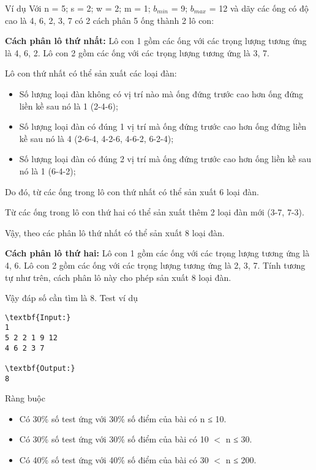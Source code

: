 Ví dụ
Với n = 5; s = 2; w = 2; m = 1; $b_{min}$ = 9; $b_{max}$ = 12 và dãy các ống có độ cao là 4, 6, 2, 3, 7 có 2 cách phân 5 ống thành 2 lô con:

\textbf{Cách phân lô thứ nhất: } Lô con 1 gồm các ống với các trọng lượng tương ứng là 4, 6, 2. Lô con 2 gồm các ống với các trọng lượng tương ứng là 3, 7.

Lô con thứ nhất có thể sản xuất các loại đàn:
\begin{itemize}
	\item Số lượng loại đàn không có vị trí nào mà ống đứng trước cao hơn ống đứng liền kề sau nó là 1 (2-4-6);
	\item Số lượng loại đàn có đúng 1 vị trí mà ống đứng trước cao hơn ống đứng liền kề sau nó là 4 (2-6-4, 4-2-6, 4-6-2, 6-2-4);
	\item Số lượng loại đàn có đúng 2 vị trí mà ống đứng trước cao hơn ống liền kề sau nó là 1 (6-4-2);
\end{itemize}

Do đó, từ các ống trong lô con thứ nhất có thể sản xuất 6 loại đàn.


Từ các ống trong lô con thứ hai có thể sản xuất thêm 2 loại đàn mới (3-7, 7-3).


Vậy, theo các phân lô thứ nhất có thể sản xuất 8 loại đàn.

\textbf{Cách phân lô thứ hai: } Lô con 1 gồm các ống với các trọng lượng tương ứng là 4, 6. Lô con 2 gồm các ống với các trọng lượng tương ứng là 2, 3, 7. Tính tương tự như trên, cách phân lô này cho phép sản xuất 8 loại đàn.

Vậy đáp số cần tìm là 8.
Test ví dụ
\begin{verbatim}
\textbf{Input:}
1
5 2 2 1 9 12
4 6 2 3 7

\textbf{Output:}
8\end{verbatim}
Ràng buộc
\begin{itemize}
	\item Có 30\% số test ứng với 30\% số điểm của bài có n ≤ 10.
	\item Có 30\% số test ứng với 30\% số điểm của bài có 10 $<$ n ≤ 30.
	\item Có 40\% số test ứng với 40\% số điểm của bài có 30 $<$ n ≤ 200.
\end{itemize}